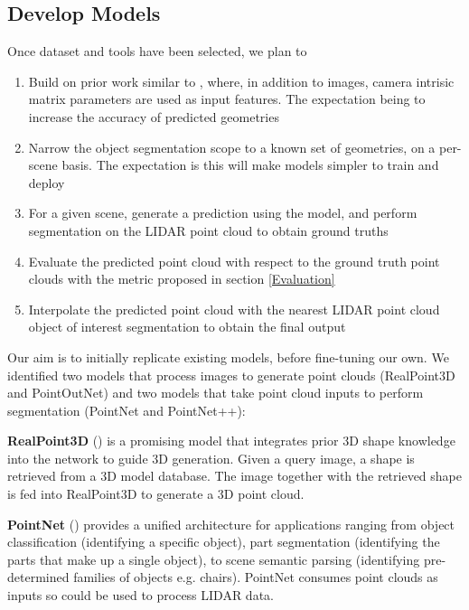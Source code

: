 \subsection{Develop Models}

Once dataset and tools have been selected, we plan to

\begin{enumerate}
  \item Build on prior work similar to \cite{LiuMonocular2016}, where, in addition to images, camera intrisic matrix parameters are used as input features. The expectation being to increase the accuracy of predicted geometries
  \item Narrow the object segmentation scope to a known set of geometries, on a per-scene basis. The expectation is this will make models simpler to train and deploy
  \item For a given scene, generate a prediction using the model, and perform segmentation on the LIDAR point cloud to obtain ground truths 
  \item Evaluate the predicted point cloud with respect to the ground truth point clouds with the metric proposed in section \ref{Evaluation}
  \item Interpolate the predicted point cloud with the nearest LIDAR point cloud object of interest segmentation to obtain the final output
\end{enumerate}

Our aim is to initially replicate existing models, before fine-tuning our own. We identified two models that process images to generate point clouds (RealPoint3D and PointOutNet) and two models that take point cloud inputs to perform segmentation (PointNet and PointNet++):  


\textbf{RealPoint3D} (\cite{xia2018realpoint3d}) is a promising model that integrates prior 3D shape knowledge into the network to guide 3D generation. Given a query image, a shape is retrieved from a 3D model database. The image together with the retrieved shape is fed into RealPoint3D to generate a 3D point cloud.   

\textbf{PointNet} (\cite{qi2016pointnet}) provides a unified architecture for applications ranging from object classification (identifying a specific object), part segmentation (identifying the parts that make up a single object), to scene semantic parsing (identifying pre-determined families of objects e.g. chairs). PointNet consumes point clouds as inputs so could be used to process LIDAR data.


